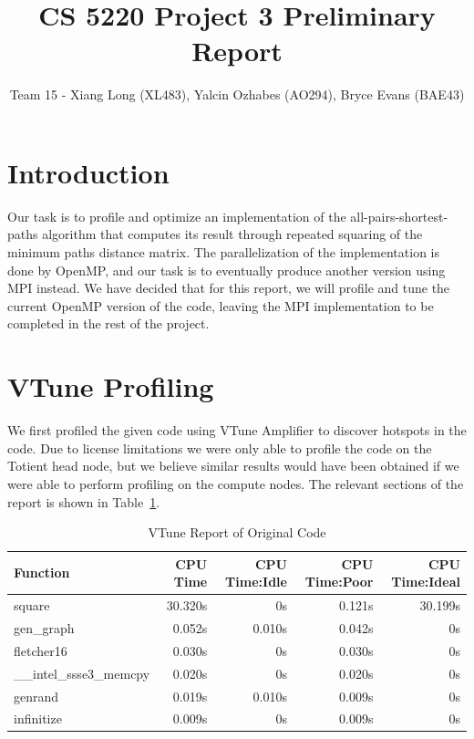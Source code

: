 \documentclass{article}
\begin{document}
\title{CS 5220 Project 3 Preliminary Report}
\author{Team 15 - Xiang Long (XL483), Yalcin Ozhabes (AO294), Bryce Evans (BAE43)}

\maketitle

\section{Introduction}

Our task is to profile and optimize an implementation of the all-pairs-shortest-paths algorithm that computes its result through repeated squaring of the minimum paths distance matrix. The parallelization of the implementation is done by OpenMP, and our task is to eventually produce another version using MPI instead. We have decided that for this report, we will profile and tune the current OpenMP version of the code, leaving the MPI implementation to be completed in the rest of the project.

\section{VTune Profiling}

We first profiled the given code using VTune Amplifier to discover hotspots in the code. Due to license limitations we were only able to profile the code on the Totient head node, but we believe similar results would have been obtained if we were able to perform profiling on the compute nodes. The relevant sections of the report is shown in Table~\ref{vtune}.

\begin{table}[here]
 \centering
  \begin{tabular}{ | l | r | r | r | r | }
 \hline
Function             & CPU Time &  CPU Time:Idle & CPU Time:Poor & CPU Time:Ideal \\ \hline
square               &  30.320s &             0s &        0.121s &        30.199s \\
gen\_graph            &   0.052s &         0.010s &        0.042s &             0s \\
fletcher16           &   0.030s &             0s &        0.030s &             0s \\
\_\_intel\_ssse3\_memcpy &   0.020s &             0s &        0.020s &             0s \\
genrand              &   0.019s &         0.010s &        0.009s &             0s \\
infinitize           &   0.009s &             0s &        0.009s &             0s \\ \hline
\end{tabular}
 \caption{VTune Report of Original Code}
 \label{vtune}
\end{table}
\end{document}
